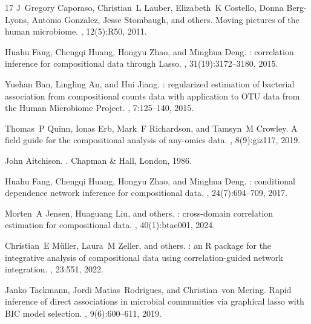 \documentclass[unnumsec,webpdf,contemporary,large,numbered]{oup-authoring-template}
\theoremstyle{plain}
\theoremstyle{definition}
\begin{document}
\begin{thebibliography}{17}
J~Gregory Caporaso, Christian~L Lauber, Elizabeth~K Costello, Donna Berg-Lyons, Antonio Gonzalez, Jesse Stombaugh, and others.
\newblock Moving pictures of the human microbiome.
, 12(5):R50, 2011.

Huahu Fang, Chengqi Huang, Hongyu Zhao, and Minghua Deng.
: correlation inference for compositional data through {Lasso}.
, 31(19):3172--3180, 2015.

Yuehan Ban, Lingling An, and Hui Jiang.
: regularized estimation of bacterial association from compositional counts data with application to {OTU} data from the {Human Microbiome Project}.
, 7:125--140, 2015.

Thomas~P Quinn, Ionas Erb, Mark~F Richardson, and Tamsyn~M Crowley.
\newblock A field guide for the compositional analysis of any-omics data.
, 8(9):giz117, 2019.

John Aitchison.
.
\newblock Chapman \& Hall, London, 1986.

Huahu Fang, Chengqi Huang, Hongyu Zhao, and Minghua Deng.
: conditional dependence network inference for compositional data.
, 24(7):694--709, 2017.

Morten~A Jensen, Huaguang Liu, and others.
: cross-domain correlation estimation for compositional data.
, 40(1):btae001, 2024.

Christian~E M{\"u}ller, Laura~M Zeller, and others.
: an R package for the integrative analysis of compositional data using correlation-guided network integration.
, 23:551, 2022.

Janko Tackmann, Jordi Matias~Rodrigues, and Christian~von Mering.
\newblock Rapid inference of direct associations in microbial communities via graphical lasso with {BIC} model selection.
, 9(6):600--611, 2019.

\end{thebibliography}
\end{document}
